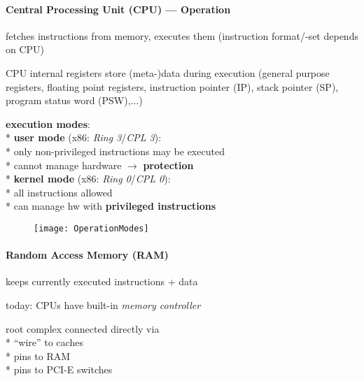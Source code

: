 \paragraph{Central Processing Unit (CPU) --- Operation}
\begin{items}
	\item fetches instructions from memory, executes them (instruction format/-set depends on CPU)
	\item CPU internal registers store (meta-)data during execution (general purpose registers, floating point registers, instruction pointer (IP), stack pointer (SP), program status word (PSW),...)
	\item \textbf{execution modes}: \\*
		\textbf{user mode} (x86: \emph{Ring 3}/\emph{CPL 3}): \\*
			\phantom{x} only non-privileged instructions may be executed \\*
			\phantom{x} cannot manage hardware \( \to \) \textbf{protection} \\*
		\textbf{kernel mode} (x86: \emph{Ring 0}/\emph{CPL 0}): \\*
			\phantom{x} all instructions allowed \\*
			\phantom{x} can manage hw with \textbf{privileged instructions}
		\begin{figure}[H]\centering\label{OperationModes}\texttt{[image: OperationModes]}\end{figure}
\end{items}

\paragraph{Random Access Memory (RAM)}
\begin{items}
	\item keeps currently executed instructions + data
	\item today: CPUs have built-in \emph{memory controller}
	\item root complex connected directly via \\*
		"`wire"' to caches \\*
		pins to RAM \\*
		pins to PCI-E switches
\end{items}

